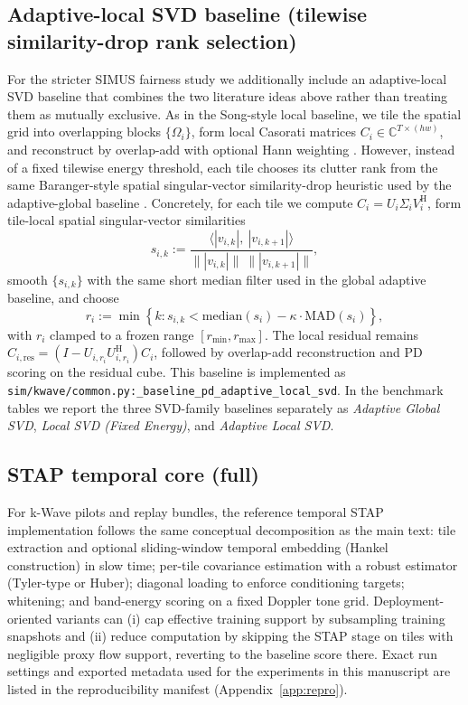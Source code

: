 \documentclass[11pt]{article}
\DeclareRobustCommand{\path}[1]{\nolinkurl{#1}}
\newcommand{\Hh}{^{\mathrm{H}}}
\newif\ifSTAPPAPERONLY
\newcommand{\SuppOrApp}[1]{\ifSTAPPAPERONLY Supplementary Material\else Appendix~\ref{#1}\fi}
\begin{document}
\subsection{Adaptive-local SVD baseline (tilewise similarity-drop rank selection)}
\label{app:baseline-adaptive-local-svd}
For the stricter SIMUS fairness study we additionally include an adaptive-local SVD baseline that combines the two literature ideas above rather than treating them as mutually exclusive. As in the Song-style local baseline, we tile the spatial grid into overlapping blocks $\{\Omega_i\}$, form local Casorati matrices $C_i\in\mathbb{C}^{T\times(hw)}$, and reconstruct by overlap-add with optional Hann weighting \cite{SongBlockwiseLocal2017}. However, instead of a fixed tilewise energy threshold, each tile chooses its clutter rank from the same Baranger-style spatial singular-vector similarity-drop heuristic used by the adaptive-global baseline \cite{BarangerAdaptiveSVD2018}. Concretely, for each tile we compute $C_i=U_i\Sigma_iV_i\Hh$, form tile-local spatial singular-vector similarities
\[
  s_{i,k} := \frac{\langle |v_{i,k}|,\ |v_{i,k+1}|\rangle}{\| |v_{i,k}|\|\ \| |v_{i,k+1}|\|},
\]
smooth $\{s_{i,k}\}$ with the same short median filter used in the global adaptive baseline, and choose
\[
  r_i := \min \left\{k : s_{i,k} < \mathrm{median}(s_i) - \kappa\cdot \mathrm{MAD}(s_i)\right\},
\]
with $r_i$ clamped to a frozen range $[r_{\min}, r_{\max}]$. The local residual remains $C_{i,\mathrm{res}}=(I-U_{i,r_i}U_{i,r_i}\Hh)C_i$, followed by overlap-add reconstruction and PD scoring on the residual cube. This baseline is implemented as \path{sim/kwave/common.py:_baseline_pd_adaptive_local_svd}. In the benchmark tables we report the three SVD-family baselines separately as \emph{Adaptive Global SVD}, \emph{Local SVD (Fixed Energy)}, and \emph{Adaptive Local SVD}.

\subsection{STAP temporal core (full)}
For k-Wave pilots and replay bundles, the reference temporal STAP implementation follows the same conceptual decomposition as the main text: tile extraction and optional sliding-window temporal embedding (Hankel construction) in slow time; per-tile covariance estimation with a robust estimator (Tyler-type or Huber); diagonal loading to enforce conditioning targets; whitening; and band-energy scoring on a fixed Doppler tone grid. Deployment-oriented variants can (i) cap effective training support by subsampling training snapshots and (ii) reduce computation by skipping the STAP stage on tiles with negligible proxy flow support, reverting to the baseline score there. Exact run settings and exported metadata used for the experiments in this manuscript are listed in the reproducibility manifest (\SuppOrApp{app:repro}).
\end{document}
